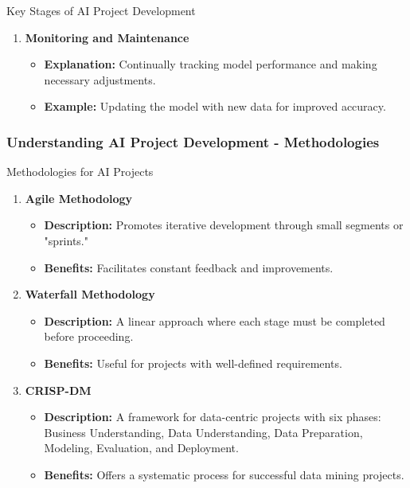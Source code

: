 \documentclass{beamer}
\begin{document}
\begin{frame}[fragile]
\begin{block}{Key Stages of AI Project Development}
\begin{enumerate}
            \item \textbf{Monitoring and Maintenance}
            \begin{itemize}
                \item \textbf{Explanation:} Continually tracking model performance and making necessary adjustments.
                \item \textbf{Example:} Updating the model with new data for improved accuracy.
            \end{itemize}
        \end{enumerate}
    \end{block}
\end{frame}

\begin{frame}[fragile]
    \frametitle{Understanding AI Project Development - Methodologies}
    \begin{block}{Methodologies for AI Projects}
        \begin{enumerate}
            \item \textbf{Agile Methodology}
            \begin{itemize}
                \item \textbf{Description:} Promotes iterative development through small segments or "sprints."
                \item \textbf{Benefits:} Facilitates constant feedback and improvements.
            \end{itemize}

            \item \textbf{Waterfall Methodology}
            \begin{itemize}
                \item \textbf{Description:} A linear approach where each stage must be completed before proceeding.
                \item \textbf{Benefits:} Useful for projects with well-defined requirements.
            \end{itemize}

            \item \textbf{CRISP-DM}
            \begin{itemize}
                \item \textbf{Description:} A framework for data-centric projects with six phases: Business Understanding, Data Understanding, Data Preparation, Modeling, Evaluation, and Deployment.
                \item \textbf{Benefits:} Offers a systematic process for successful data mining projects.
            \end{itemize}
        \end{enumerate}
    \end{block}
\end{frame}
\end{document}

